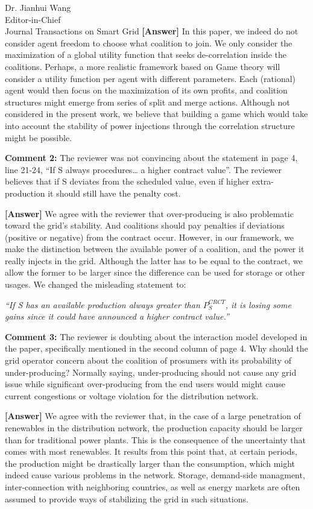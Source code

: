 \documentclass{letter}
\begin{document}
\begin{letter}{Dr. Jianhui Wang \\ Editor-in-Chief \\ Journal Transactions on Smart Grid }
\textbf{[Answer]} In this paper, we indeed do not consider agent freedom to choose what coalition to join. We only consider the maximization of a global utility function that seeks de-correlation inside the coalitions. Perhaps, a more realistic framework based on Game theory will consider a utility function per agent with different parameters. Each (rational) agent would then focus on the maximization of its own profits, and coalition structures might emerge from series of split and merge actions. Although not considered in the present work, we believe that building a game which would take into account the stability of power injections through the correlation structure might be possible.


\textbf{Comment 2:} The reviewer was not convincing about the statement in page 4, line 21-24, “If S always procedures… a higher contract value”. The reviewer believes that if S deviates from the scheduled value, even if higher extra-production it should still have the penalty cost.


\textbf{[Answer]} We agree with the reviewer that over-producing is also problematic toward the grid’s stability. And coalitions should pay penalties if deviations (positive or negative) from the contract occur. However, in our framework, we make the distinction between the available power of a coalition, and the power it really injects in the grid. Although the latter has to be equal to the contract, we allow the former to be larger since the difference can be used for storage or other usages. We changed the misleading statement to:

\textit{“If S has an available production always greater than $ P_{S}^{CRCT} $, it is losing some gains since it could have announced a higher contract value.”}


\textbf{Comment 3:} The reviewer is doubting about the interaction model developed in the paper, specifically mentioned in the second column of page 4. Why should the grid operator concern about the coalition of prosumers with its probability of under-producing? Normally saying, under-producing should not cause any grid issue while significant over-producing from the end users would might cause current congestions or voltage violation for the distribution network.


\textbf{[Answer]} We agree with the reviewer that, in the case of a large penetration of renewables in the distribution network, the production capacity should be larger than for traditional power plants. This is the consequence of the uncertainty that comes with most renewables. It results from this point that, at certain periods, the production might be drastically larger than the consumption, which might indeed cause various problems in the network. Storage, demand-side managment, inter-connection with neighboring countries, as well as energy markets are often assumed to provide ways of stabilizing the grid in such situations. 


\end{letter}
\end{document}
